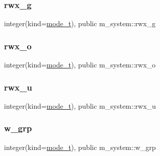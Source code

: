 \subsubsection{\texorpdfstring{rwx\+\_\+g}{rwx\_g}}
{\footnotesize\ttfamily integer(kind=\mbox{\hyperlink{namespacem__system_abdb5cc27c945379d844db4830d499050}{mode\+\_\+t}}), public m\+\_\+system\+::rwx\+\_\+g}

\mbox{\label{namespacem__system_a4a602e6ffd2e4b24dc7d80b5e8db3d02}} 
\subsubsection{\texorpdfstring{rwx\+\_\+o}{rwx\_o}}
{\footnotesize\ttfamily integer(kind=\mbox{\hyperlink{namespacem__system_abdb5cc27c945379d844db4830d499050}{mode\+\_\+t}}), public m\+\_\+system\+::rwx\+\_\+o}

\mbox{\label{namespacem__system_a126dc96188cde6e9932e1775868b3059}} 
\subsubsection{\texorpdfstring{rwx\+\_\+u}{rwx\_u}}
{\footnotesize\ttfamily integer(kind=\mbox{\hyperlink{namespacem__system_abdb5cc27c945379d844db4830d499050}{mode\+\_\+t}}), public m\+\_\+system\+::rwx\+\_\+u}

\mbox{\label{namespacem__system_afbbb4a0d04bc0dbaad651a6ab04ffaef}} 
\subsubsection{\texorpdfstring{w\+\_\+grp}{w\_grp}}
{\footnotesize\ttfamily integer(kind=\mbox{\hyperlink{namespacem__system_abdb5cc27c945379d844db4830d499050}{mode\+\_\+t}}), public m\+\_\+system\+::w\+\_\+grp}

\mbox{\label{namespacem__system_a8f34e61e94106b90ca48b9ef1165474c}} 
